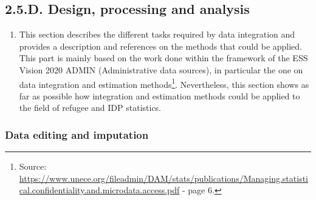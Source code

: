 \documentclass[
]{article}
\providecommand{\tightlist}{%
  \setlength{\itemsep}{0pt}\setlength{\parskip}{0pt}}
\begin{document}
\hypertarget{section-4}{%
\subsubsection{}\label{section-4}}

\hypertarget{d.-design-processing-and-analysis}{%
\subsection{2.5.D. Design, processing and analysis}\label{d.-design-processing-and-analysis}}

\begin{enumerate}
\def\labelenumi{\arabic{enumi}.}
\setcounter{enumi}{218}
\tightlist
\item
  This section describes the different tasks required by data
  integration and provides a description and references on the methods
  that could be applied. This part is mainly based on the work done
  within the framework of the ESS Vision 2020 ADMIN (Administrative
  data sources), in particular the one on data integration and
  estimation methods\footnote{Source:
    \url{https://www.unece.org/fileadmin/DAM/stats/publications/Managing.statistical.confidentiality.and.microdata.access.pdf}
    - page 6.}. Nevertheless, this section shows as far as
  possible how integration and estimation methods could be applied to
  the field of refugee and IDP statistics.
\end{enumerate}

\hypertarget{d.1.-data-editing-and-imputation}{%
\subsubsection{Data editing and imputation}\label{d.1.-data-editing-and-imputation}}
\end{document}
